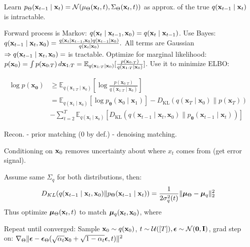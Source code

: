 \begin{definition}[Denoising]
    Learn \(p_\Theta(\vb{x}_{t-1} \mid \vb{x}_{t}) = \operatorname{\mathcal{N}}(\mu_\Theta(\vb{x}_t, t), \Sigma_\Theta(\vb{x}_t, t))\) as approx. of the true \(q(\vb{x}_{t-1} \mid \vb{x}_t)\) is intractable. 
    
    Forward process is Markov: \(q(\vb{x}_t \mid \vb{x}_{t-1}, \vb{x}_0) = q(\vb{x}_t \mid \vb{x}_{t-1})\). Use Bayes:
    \(
    q(\vb{x}_{t-1} \mid \vb{x}_t, \vb{x}_0) = \frac{q(\vb{x}_t \mid \vb{x}_{t-1}, \vb{x}_0) q(\vb{x}_{t-1} \mid \vb{x}_0)}{q(\vb{x}_t \mid \vb{x}_0)}.
    \)
    All terms are Gaussian \(\Rightarrow q(\vb{x}_{t-1} \mid \vb{x}_t, \vb{x}_0) = \) is tractable. Optimize for marginal likelihood:
    \(p(\vb{x}_0) = \int p(\vb{x}_{0:T}) \, d\vb{x}_{1:T} = \mathbb{E}_{q(\vb{x}_{1:T} \mid \vb{x}_0)}[\frac{p(\vb{x}_{0:T})}{q(\vb{x}_{1:T} \mid \vb{x}_0)}]\).    
    Use it to minimize ELBO:

    \vspace{-10pt}
    \begin{align*}
        \log p(\boldsymbol{x_0}) &\geq \mathbb{E}_{q\left(\boldsymbol{x}_{1: T} \mid \boldsymbol{x}_0\right)}\left[\log \frac{p\left(\boldsymbol{x}_{0: T}\right)}{q\left(\boldsymbol{x}_{1: T} \mid \boldsymbol{x}_0\right)}\right] \\
        &=\mathbb{E}_{q\left(\boldsymbol{x}_1 \mid \boldsymbol{x}_0\right)}\left[\log p_{\boldsymbol{\theta}}\left(\boldsymbol{x}_0 \mid \boldsymbol{x}_1\right)\right]-D_{\mathrm{KL}}\left(q\left(\boldsymbol{x}_T \mid \boldsymbol{x}_0\right) \| p\left(\boldsymbol{x}_T\right)\right) \\
        &- \sum_{t=2}^T \mathbb{E}_{q\left(\boldsymbol{x}_t \mid \boldsymbol{x}_0\right)}\left[D_{\mathrm{KL}}\left(q\left(\boldsymbol{x}_{t-1} \mid \boldsymbol{x}_t, \boldsymbol{x}_0\right) \| p_{\boldsymbol{\theta}}\left(\boldsymbol{x}_{t-1} \mid \boldsymbol{x}_t\right)\right)\right]
    \end{align*}
    \begin{center}
    Recon. - prior matching (0 by def.) - denoising matching.
    \end{center}
    Conditioning on \(\vb{x}_0\) removes uncertainty about where \(x_t\) comes from (get error signal).
\end{definition}

\begin{definition}[Training]
    Assume same \(\Sigma_q\) for both distributions, then:
    \[D_{KL}(q(\vb{x}_{t-1} \mid \vb{x}_t, \vb{x}_0) \Vert p_{\Theta}(\vb{x}_{t-1} \mid \vb{x}_t)) = \frac{1}{2\sigma_q^2(t)}\Vert\vb*{\mu}_{\Theta} - \vb*{\mu}_q\Vert_2^2\]
    Thus optimize \(\vb*{\mu}_{\Theta}(\vb{x}_t, t)\) to match \(\vb*{\mu}_q(\vb{x}_t, \vb{x}_0)\), where

    \vspace{-12pt}

    Repeat until converged: Sample \(\vb{x}_0 \sim q(\vb{x}_0)\), \(t \sim \operatorname{\mathcal{U}}([T]), \vb*{\epsilon} \sim \operatorname{\mathcal{N}}(\vb{0}, \vb{I})\), grad step on: \(\nabla_{\Theta} \Vert\vb*{\epsilon} - \vb*{\epsilon}_{\Theta}(\sqrt{\alpha_t}\vb{x}_0 + \sqrt{1 - \alpha_t}\vb*{\epsilon}, t)\Vert^2\)
\end{definition}

